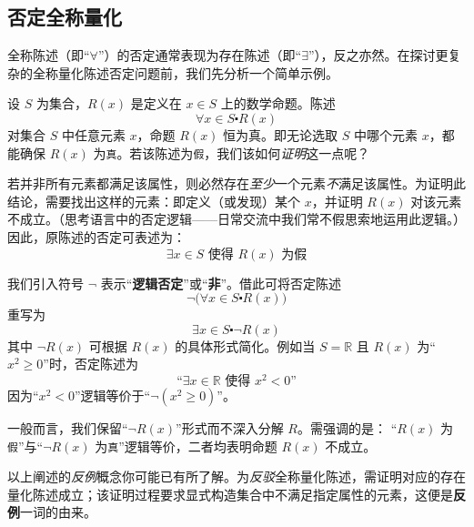 \subsection{否定全称量化}

全称陈述（即``$\forall$''）的否定通常表现为存在陈述（即``$\exists$''），反之亦然。在探讨更复杂的全称量化陈述否定问题前，我们先分析一个简单示例。

设 $S$ 为集合，$R(x)$ 是定义在 $x \in S$ 上的数学命题。陈述
\[\forall x \in S \centerdot R(x)\]
对集合 $S$ 中任意元素 $x$，命题 $R(x)$ 恒为真。即无论选取 $S$ 中哪个元素 $x$，都能确保 $R(x)$ 为\verb|真|。若该陈述为\verb|假|，我们该如何\emph{证明}这一点呢？

若并非所有元素都满足该属性，则必然存在\emph{至少}一个元素\emph{不}满足该属性。为证明此结论，需要找出这样的元素：即定义（或发现）某个 $x$，并证明 $R(x)$ 对该元素不成立。（思考语言中的否定逻辑——日常交流中我们常不假思索地运用此逻辑。）因此，原陈述的否定可表述为：
\[\exists x \in S \text{\ 使得\ } R(x) \text{\ 为假}\]

我们引入符号 $\neg$ 表示``\textbf{逻辑否定}''或``\textbf{非}''。借此可将否定陈述
\[\neg\big(\forall x \in S \centerdot R(x)\big)\]
重写为
\[\exists x \in S \centerdot \neg R(x)\]
其中 $\neg R(x)$ 可根据 $R(x)$ 的具体形式简化。例如当 $S = \mathbb{R}$ 且 $R(x)$ 为``$x^2 \ge 0$''时，否定陈述为
\[\text{``}\exists x \in \mathbb{R} \text{\ 使得\ } x^2 < 0 \text{''}\]
因为``$x^2 < 0$''逻辑等价于``$\neg(x^2 \ge 0)$''。

一般而言，我们保留``$\neg R(x)$''形式而不深入分解 $R$。需强调的是： ``$R(x)$ 为\verb|假|''与``$\neg R(x)$ 为\verb|真|''逻辑等价，二者均表明命题 $R(x)$ 不成立。

以上阐述的\emph{反例}概念你可能已有所了解。为\emph{反驳}全称量化陈述，需证明对应的存在量化陈述成立；该证明过程要求显式构造集合中不满足指定属性的元素，这便是\textbf{反例}一词的由来。

